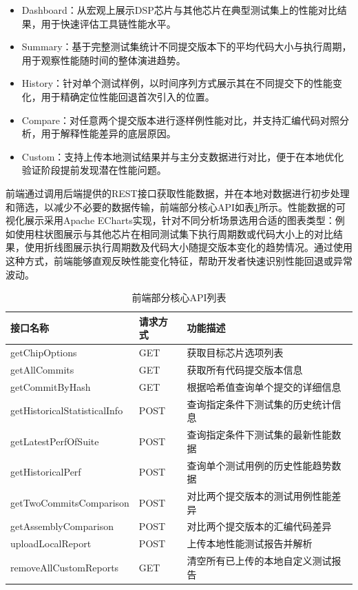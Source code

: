 \begin{itemize}
	\item 
	Dashboard：从宏观上展示DSP芯片与其他芯片在典型测试集上的性能对比结果，用于快速评估工具链性能水平。
	
	\item
	Summary：基于完整测试集统计不同提交版本下的平均代码大小与执行周期，用于观察性能随时间的整体演进趋势。
	
	\item
	History：针对单个测试样例，以时间序列方式展示其在不同提交下的性能变化，用于精确定位性能回退首次引入的位置。
	
	\item
	Compare：对任意两个提交版本进行逐样例性能对比，并支持汇编代码对照分析，用于解释性能差异的底层原因。
	
	\item
	Custom：支持上传本地测试结果并与主分支数据进行对比，便于在本地优化验证阶段提前发现潜在性能问题。
	
\end{itemize}

前端通过调用后端提供的REST接口获取性能数据，并在本地对数据进行初步处理和筛选，以减少不必要的数据传输，前端部分核心API如表\ref{tab:frontend_api_simple}所示。性能数据的可视化展示采用Apache ECharts实现，针对不同分析场景选用合适的图表类型：例如使用柱状图展示与其他芯片在相同测试集下执行周期数或代码大小上的对比结果，使用折线图展示执行周期数及代码大小随提交版本变化的趋势情况。通过使用这种方式，前端能够直观反映性能变化特征，帮助开发者快速识别性能回退或异常波动。

\begin{table}[htbp]
	\centering
	\caption{前端部分核心API列表}
	\label{tab:frontend_api_simple}
	
	\renewcommand{\arraystretch}{1.2}
	{\footnotesize
		\begin{tabularx}{\linewidth}{
				>{\raggedright\arraybackslash}m{2.5cm}
				>{\centering\arraybackslash}X
				>{\centering\arraybackslash}X
			}
			\toprule
			\textbf{接口名称} & \textbf{请求方式} & \textbf{功能描述} \\
			\midrule
			getChipOptions & GET & 获取目标芯片选项列表 \\
			getAllCommits & GET & 获取所有代码提交版本信息 \\
			getCommitByHash & GET & 根据哈希值查询单个提交的详细信息 \\
			getHistoricalStatisticalInfo & POST & 查询指定条件下测试集的历史统计信息 \\
			getLatestPerfOfSuite & POST & 查询指定条件下测试集的最新性能数据 \\
			getHistoricalPerf & POST & 查询单个测试用例的历史性能趋势数据 \\
			getTwoCommitsComparison & POST & 对比两个提交版本的测试用例性能差异 \\
			getAssemblyComparison & POST & 对比两个提交版本的汇编代码差异 \\
			uploadLocalReport & POST & 上传本地性能测试报告并解析 \\
			removeAllCustomReports & GET & 清空所有已上传的本地自定义测试报告 \\
			\bottomrule
		\end{tabularx}
	}
\end{table}


